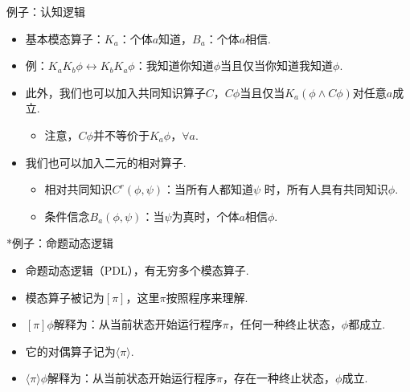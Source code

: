    \begin{frame}{例子：认知逻辑}
    \begin{itemize}
        \item 基本模态算子：$K_a$：个体$a$知道，$B_a$：个体$a$相信.
        \item 例：$K_aK_b\phi\leftrightarrow K_bK_a\phi$：我知道你知道$\phi$当且仅当你知道我知道$\phi$.
        \item 此外，我们也可以加入共同知识算子$C$，$C \phi$当且仅当$K_a(\phi\wedge C\phi)$对任意$a$成立.
        \begin{itemize}
            \item 注意，$C\phi$并不等价于$K_a\phi$，$\forall a$.
        \end{itemize}
        \item 我们也可以加入二元的相对算子.
        \begin{itemize}
            \item 相对共同知识$C^r(\phi,\psi)$：当所有人都知道$\psi$        时，所有人具有共同知识$\phi$.
            \item 条件信念$B_a(\phi,\psi)$：当$\psi$为真时，个体$a$相信$\phi$.
        \end{itemize} 
    \end{itemize}
    \end{frame}
    
    \begin{frame}{*例子：命题动态逻辑}
    \begin{itemize}
        \item 命题动态逻辑（PDL），有无穷多个模态算子.
        \item 模态算子被记为$[\pi]$，这里$\pi$按照程序来理解.
        \item $[\pi]\phi$解释为：从当前状态开始运行程序$\pi$，任何一种终止状态，$\phi$都成立.
        \item 它的对偶算子记为$\langle\pi\rangle$.
        \item $\langle\pi\rangle\phi$解释为：从当前状态开始运行程序$\pi$，存在一种终止状态，$\phi$成立.
    \end{itemize}
    \end{frame}
    
